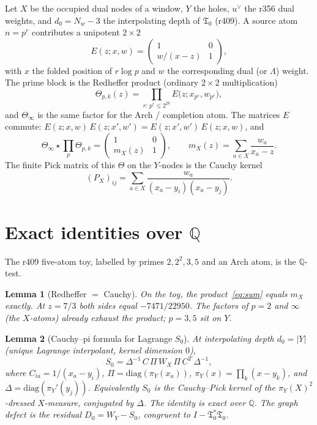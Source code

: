 \documentclass[11pt]{article}
\newtheorem{lemma}{Lemma}
\theoremstyle{remark}
\newcommand{\Tfrak}{\mathfrak{T}}
\newcommand{\redh}{\mathbin{\star}}
\begin{document}
Let $X$ be the occupied dual nodes of a window, $Y$ the
holes, $u^\vee$ the r356 dual weights, and
$d_0=N_w-3$ the interpolating depth of $\Tfrak_0$ (r409).
A source atom $n=p^r$ contributes a unipotent $2\times 2$
\begin{equation}\label{eq:E}
E(z;x,w)
=\begin{pmatrix}1&0\\ w/(x-z)&1\end{pmatrix},
\end{equation}
with $x$ the folded position of $r\log p$ and $w$ the
corresponding dual (or $\Lambda$) weight.
The prime block is the Redheffer product (ordinary
$2\times 2$ multiplication)
\begin{equation}\label{eq:Thetap}
\Theta_{p,k}(z)
=\prod_{r:\,p^r\le 2^{2k}} E\bigl(z;x_{p^r},w_{p^r}\bigr),
\end{equation}
and $\Theta_\infty$ is the same factor for the Arch /
completion atom.
The matrices $E$ commute:
$E(z;x,w)\,E(z;x',w')=E(z;x',w')\,E(z;x,w)$, and
\begin{equation}\label{eq:sum}
\Theta_\infty\redh\prod_p\Theta_{p,k}
=\begin{pmatrix}1&0\\ m_X(z)&1\end{pmatrix},
\qquad
m_X(z)=\sum_{a\in X}\frac{w_a}{x_a-z}.
\end{equation}
The finite Pick matrix of this $\Theta$ on the $Y$-nodes
is the Cauchy kernel
\begin{equation}\label{eq:PX}
(P_X)_{ij}
=\sum_{a\in X}\frac{w_a}{(x_a-y_i)(x_a-y_j)}.
\end{equation}

\section{Exact identities over $\mathbb{Q}$}\label{sec:q}

The r409 five-atom toy, labelled by primes
$2,2^2,3,5$ and an Arch atom, is the $\mathbb{Q}$-test.

\begin{lemma}[Redheffer $=$ Cauchy]\label{lem:redh}
On the toy, the product~\eqref{eq:sum} equals $m_X$
exactly.
At $z=7/3$ both sides equal $-7471/22950$.
The factors of $p=2$ and $\infty$ (the $X$-atoms)
already exhaust the product; $p=3,5$ sit on $Y$.
\end{lemma}

\begin{lemma}[Cauchy--pi formula for Lagrange $S_0$]\label{lem:pi}
At interpolating depth $d_0=|Y|$ (unique Lagrange
interpolant, kernel dimension $0$),
\[
S_0
=\Delta^{-1}\,C\,\Pi\,W_X\,\Pi\,C^T\,\Delta^{-1},
\]
where $C_{ia}=1/(x_a-y_i)$, $\Pi=\mathrm{diag}(\pi_Y(x_a))$,
$\pi_Y(x)=\prod_k(x-y_k)$, and
$\Delta=\mathrm{diag}(\pi_Y'(y_j))$.
Equivalently $S_0$ is the Cauchy--Pick kernel of the
$\pi_Y(X)^2$-dressed $X$-measure, conjugated by $\Delta$.
The identity is exact over $\mathbb{Q}$.
The graph defect is the residual
$D_0=W_Y-S_0$, congruent to $I-\Tfrak_0^*\Tfrak_0$.
\end{lemma}
\end{document}
